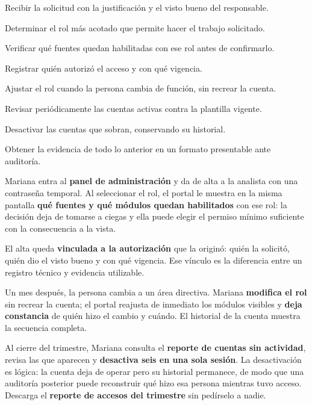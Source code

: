 \begin{uxpreg}
\item Recibir la solicitud con la justificación y el visto bueno del responsable.
\item Determinar el rol más acotado que permite hacer el trabajo solicitado.
\item Verificar qué fuentes quedan habilitadas con ese rol antes de confirmarlo.
\item Registrar quién autorizó el acceso y con qué vigencia.
\item Ajustar el rol cuando la persona cambia de función, sin recrear la cuenta.
\item Revisar periódicamente las cuentas activas contra la plantilla vigente.
\item Desactivar las cuentas que sobran, conservando su historial.
\item Obtener la evidencia de todo lo anterior en un formato presentable ante auditoría.
\end{uxpreg}


Mariana entra al \textbf{panel de administración} y da de alta a la analista con una contraseña
temporal. Al seleccionar el rol, el portal le muestra en la misma pantalla \textbf{qué fuentes y
qué módulos quedan habilitados} con ese rol: la decisión deja de tomarse a ciegas y ella puede
elegir el permiso mínimo suficiente con la consecuencia a la vista.

El alta queda \textbf{vinculada a la autorización} que la originó: quién la solicitó, quién dio
el visto bueno y con qué vigencia. Ese vínculo es la diferencia entre un registro técnico y
evidencia utilizable.

Un mes después, la persona cambia a un área directiva. Mariana \textbf{modifica el rol} sin
recrear la cuenta; el portal reajusta de inmediato los módulos visibles y \textbf{deja
constancia} de quién hizo el cambio y cuándo. El historial de la cuenta muestra la secuencia
completa.

Al cierre del trimestre, Mariana consulta el \textbf{reporte de cuentas sin actividad}, revisa
las que aparecen y \textbf{desactiva seis en una sola sesión}. La desactivación es lógica: la
cuenta deja de operar pero su historial permanece, de modo que una auditoría posterior puede
reconstruir qué hizo esa persona mientras tuvo acceso. Descarga el \textbf{reporte de accesos
del trimestre} sin pedírselo a nadie.

